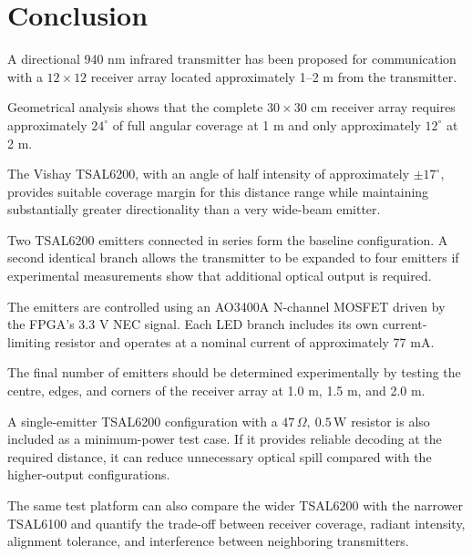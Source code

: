 \documentclass[a4paper,12pt]{article}
\begin{document}

\section{Conclusion}

A directional 940 nm infrared transmitter has been proposed for
communication with a \(12 \times 12\) receiver array located
approximately 1--2 m from the transmitter.

Geometrical analysis shows that the complete \(30 \times 30\) cm
receiver array requires approximately \(24^\circ\) of full angular
coverage at 1 m and only approximately \(12^\circ\) at 2 m.

The Vishay TSAL6200, with an angle of half intensity of approximately
\(\pm17^\circ\), provides suitable coverage margin for this distance
range while maintaining substantially greater directionality than a
very wide-beam emitter.

Two TSAL6200 emitters connected in series form the baseline
configuration. A second identical branch allows the transmitter to be
expanded to four emitters if experimental measurements show that
additional optical output is required.

The emitters are controlled using an AO3400A N-channel MOSFET driven by
the FPGA's 3.3 V NEC signal. Each LED branch includes its own
current-limiting resistor and operates at a nominal current of
approximately 77 mA.

The final number of emitters should be determined experimentally by
testing the centre, edges, and corners of the receiver array at
1.0 m, 1.5 m, and 2.0 m.

A single-emitter TSAL6200 configuration with a
\(47\,\Omega,\ 0.5\,\text{W}\) resistor is also included as a minimum-power
test case. If it provides reliable decoding at the required distance, it can
reduce unnecessary optical spill compared with the higher-output
configurations.

The same test platform can also compare the wider TSAL6200 with the
narrower TSAL6100 and quantify the trade-off between receiver coverage,
radiant intensity, alignment tolerance, and interference between
neighboring transmitters.


\end{document}
